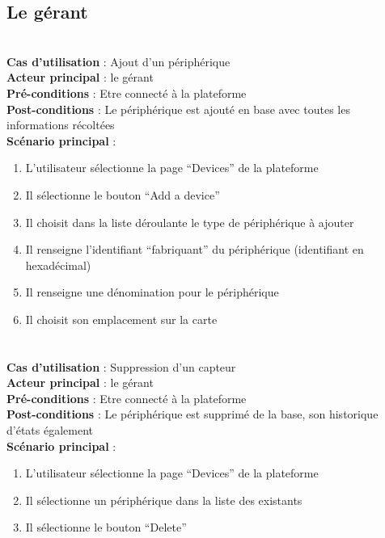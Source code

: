 \subsection{Le gérant}
~\\
\textbf{Cas d’utilisation} : Ajout d’un périphérique\\
\textbf{Acteur principal} : le gérant\\
\textbf{Pré-conditions} : Etre connecté à la plateforme\\
\textbf{Post-conditions} : Le périphérique est ajouté en base avec toutes les informations récoltées\\
\textbf{Scénario principal} :
\begin{enumerate}
 \item L’utilisateur sélectionne la page “Devices” de la plateforme
 \item Il sélectionne le bouton “Add a device”
 \item Il choisit dans la liste déroulante le type de périphérique à ajouter
 \item Il renseigne l’identifiant “fabriquant” du périphérique (identifiant en hexadécimal)
 \item Il renseigne une dénomination pour le périphérique
 \item Il choisit son emplacement sur la carte
\end{enumerate}

\paragraph{}
~\\
\textbf{Cas d’utilisation} : Suppression d’un capteur\\
\textbf{Acteur principal} : le gérant\\
\textbf{Pré-conditions} : Etre connecté à la plateforme\\
\textbf{Post-conditions} : Le périphérique est supprimé de la base, son historique d’états également\\
\textbf{Scénario principal} :
\begin{enumerate}
 \item L’utilisateur sélectionne la page “Devices” de la plateforme
 \item Il sélectionne un périphérique dans la liste des existants
 \item Il sélectionne le bouton “Delete”
\end{enumerate}

